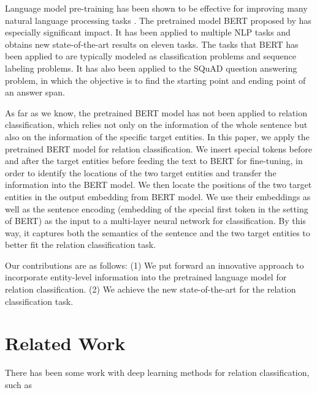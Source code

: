 \documentclass[11pt]{article}
\providecommand{\cite}[1]{\citeauthoryear{#1}}
\renewcommand{\cite}{\citep}
\begin{document}
Language model pre-training has been shown to be effective
for improving many natural language processing
tasks \cite{Dai_NIPS_2015,Peters_arxiv_2017,OpenAI_2018_tech,Ruder_ACL_2018,bert_Jacobv_corr_bert_2018}. 
The pretrained model BERT proposed by \cite{bert_Jacobv_corr_bert_2018} 
has especially significant impact. It has been applied to multiple NLP tasks and obtains new state-of-the-art results on eleven tasks. The tasks that BERT has been applied to are typically modeled as classification problems and sequence labeling problems.  
It has also been applied to the
SQuAD question answering \cite{Rajpurkar_squad_2016} problem, in
which the objective is to find the starting point and ending point of an answer span. 

As far as we know, the pretrained BERT model \cite{bert_Jacobv_corr_bert_2018} has not been 
applied to relation classification, which relies 
not only on the information of the whole sentence but also 
on the information of the specific target entities.
In this paper, we apply the pretrained BERT model for relation classification. 
We insert special tokens before and after the target entities 
before feeding the text to BERT for fine-tuning, 
in order to
identify the locations of the two target
entities and transfer the information into the BERT model. 
We then locate the positions of the two target entities in the output embedding
from BERT model. We use their embeddings as well as the sentence encoding (embedding of the special first token in the setting of BERT)
as the input to a multi-layer neural network for classification.
By this way, it captures both the semantics of the sentence and
the two target entities to better fit the relation classification task.

Our contributions are as follows: (1) We put forward an innovative approach
to incorporate entity-level information into the pretrained language model for relation classification. (2) We achieve the new state-of-the-art for the relation classification task.




 \section{Related Work}  
\label{related}


There has been some work with deep learning methods for relation
classification, such as 
\cite{Socher_EMNLP_2012,Zeng_coling_2014,Yu_NIPS_Worksho_2014,Nogueira_ACL_2015}
\end{document}
